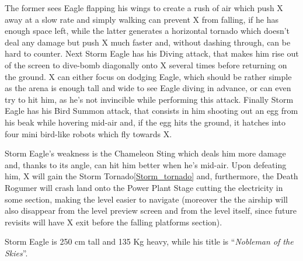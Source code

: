  The former sees Eagle flapping his wings to create a rush of air which push X away at a slow rate and simply walking can prevent X from falling, if he has enough space left, while the latter generates a horizontal tornado which doesn't deal any damage but push X much faster and, without dashing through, can be hard to counter. Next Storm Eagle has his Diving attack, that makes him rise out of the screen to dive-bomb diagonally onto X several times before returning on the ground. X can either focus on dodging Eagle, which should be rather simple as the arena is enough tall and wide to see Eagle diving in advance, or can even try to hit him, as he's not invincible while performing this attack. Finally Storm Eagle has his Bird Summon attack, that consists in him shooting out an egg from his beak while hovering mid-air and, if the egg hits the ground, it hatches into four mini bird-like robots which fly towards X. 

 Storm Eagle's weakness is the Chameleon Sting which deals him more damage and, thanks to its angle, can hit him better when he's mid-air. Upon defeating him, X will gain the Storm Tornado\ref{Storm_tornado} and, furthermore, the Death Rogumer will crash land onto the Power Plant Stage cutting the electricity in some section, making the level easier to navigate (moreover the the airship will also disappear from the level preview screen and from the level itself, since future revisits will have X exit before the falling platforms section).
 
 Storm Eagle is 250 cm tall and 135 Kg heavy, while his title is ``\textit{Nobleman of the Skies}''\cite{book:MMX_Complete_art}.


